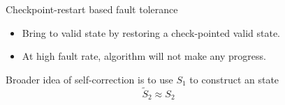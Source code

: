 \begin{columns}
\begin{column}{0.5\textwidth}
{}

\end{column}
\begin{column}{0.5\textwidth}
\begin{block}{Checkpoint-restart based fault tolerance}
\begin{itemize}
\item<1-> Bring to valid state by restoring a check-pointed valid state.
\item<2-> \color{red} At high fault rate, algorithm will not make any progress.



\end{itemize}
\end{block}

\pause
\pause
{\color{dpg} Broader idea of self-correction is to use $S_{1}$ to construct an state 
\[\tilde{S}_{2} \approx S_{2}
\]
}
\end{column}
\end{columns}


\lyxframeend{}